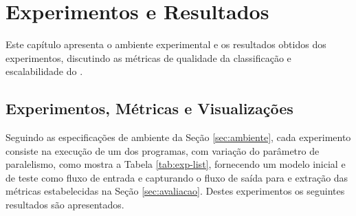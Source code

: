


% 
% 

\chapter{Experimentos e Resultados}\label{cha:results}

Este capítulo apresenta o ambiente experimental e os resultados obtidos dos
experimentos, discutindo as métricas de qualidade da classificação e
escalabilidade do \mfog.


% 

\section{Experimentos, Métricas e Visualizações}
\label{sec:experiments}

\newcommand{\expA}{\textit{a-Referência}\xspace}
\newcommand{\expB}{\textit{b-Sequencial}\xspace}
\newcommand{\expC}{\textit{c-Paralelo}\xspace}
\newcommand{\expD}{\textit{d-Distribuído}\xspace}

Seguindo as especificações de ambiente da Seção \ref{sec:ambiente}, cada
experimento consiste na execução de um dos programas,
com variação do parâmetro de paralelismo, como mostra a Tabela \ref{tab:exp-list},
fornecendo um modelo inicial e \dataset de teste como fluxo de entrada e
capturando o fluxo de saída para e extração das métricas estabelecidas na Seção
\ref{sec:avaliacao}.
Destes experimentos os seguintes resultados são apresentados.


